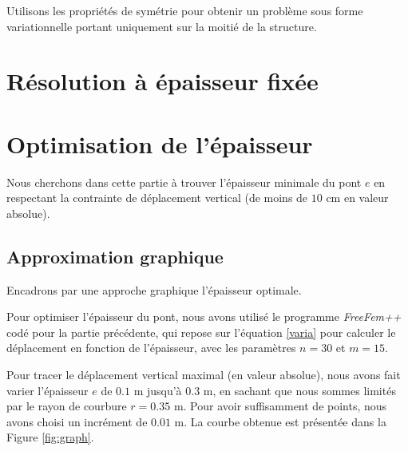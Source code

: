 \documentclass{article}
\begin{document}
    
    

    \begin{problem}{2}
    Utilisons les propriétés de symétrie pour obtenir un problème sous forme variationnelle portant uniquement sur la moitié de la structure.
    \end{problem}
    
    

    \section{Résolution à épaisseur fixée}
        

    \section{Optimisation de l'épaisseur}
    Nous cherchons dans cette partie à trouver l'épaisseur minimale du pont $e$ en respectant la contrainte de déplacement vertical (de moins de $10$ cm en valeur absolue).

    \subsection{Approximation graphique}
    \begin{problem}{5}
        Encadrons par une approche graphique l'épaisseur optimale.
    \end{problem}
    Pour optimiser l'épaisseur du pont,
     nous avons utilisé le programme \emph{FreeFem++} codé pour la partie précédente,
     qui repose sur l'équation \ref{varia} pour calculer le déplacement en fonction de l'épaisseur, avec les paramètres $n=30$ et $m=15$.

    Pour tracer le déplacement vertical maximal (en valeur absolue),
    nous avons fait varier l'épaisseur $e$
    de $0.1$ m jusqu'à $0.3$ m, en sachant que nous sommes limités par le rayon de courbure $r = 0.35$ m.
    Pour avoir suffisamment de points, nous avons choisi un incrément de $0.01$ m.
    La courbe obtenue est présentée dans la Figure \ref{fig:graph}.
\end{document}
